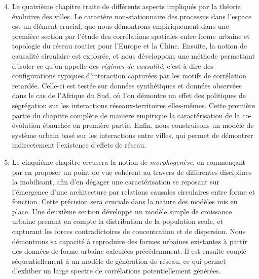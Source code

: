 {\begin{enumerate}\setcounter{enumi}{3}
	\item Le quatrième chapitre traite de différents aspects impliqués par la théorie évolutive des villes. Le caractère non-stationnaire des processus dans l'espace est un élément crucial, que nous démontrons empiriquement dans une première section par l'étude des corrélations spatiales entre forme urbaine et topologie du réseau routier pour l'Europe et la Chine. Ensuite, la notion de causalité circulaire est explorée, et nous développons une méthode permettant d'isoler ce qu'on appelle des \emph{régimes de causalité}, c'est-à-dire des configurations typiques d'interaction capturées par les motifs de corrélation retardée. Celle-ci est testée sur données synthétiques et données observées dans le cas de l'Afrique du Sud, où l'on démontre un effet des politiques de ségrégation sur les interactions réseaux-territoires elles-mêmes. Cette première partie du chapitre complète de manière empirique la caractérisation de la co-évolution ébauchée en première partie. Enfin, nous construisons un modèle de système urbain basé sur les interactions entre villes, qui permet de démontrer indirectement l'existence d'effets de réseau.
	\item Le cinquième chapitre creusera la notion de \emph{morphogenèse}, en commençant par en proposer un point de vue cohérent au travers de différentes disciplines la mobilisant, afin d'en dégager une caractérisation se reposant sur l'émergence d'une architecture par relations causales circulaires entre forme et fonction. Cette précision sera cruciale dans la nature des modèles mis en place. Une deuxième section développe un modèle simple de croissance urbaine prenant en compte la distribution de la population seule, et capturant les forces contradictoires de concentration et de dispersion. Nous démontrons sa capacité à reproduire des formes urbaines existantes à partir des données de forme urbaine calculées précédemment. Il est ensuite couplé séquentiellement à un modèle de génération de réseau, ce qui permet d'exhiber un large spectre de corrélations potentiellement générées.
\end{enumerate}
}

